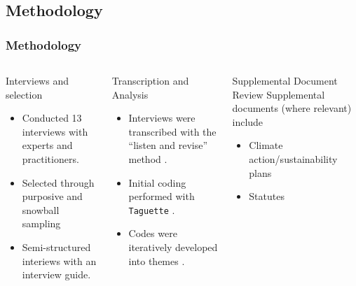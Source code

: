 \subsection{Methodology}

\begin{frame}
    \frametitle{Methodology}


    \begin{columns}
        \column[t]{3.33cm}
        \begin{block}{Interviews and selection}
            \begin{itemize}[<+->]
                \item Conducted 13 interviews with experts and practitioners.
                \item Selected through purposive and snowball sampling
                \item Semi-structured interiews with an interview guide.
            \end{itemize}
        \end{block}
        \pause
        \column[t]{3.33cm}
        \begin{block}{Transcription and Analysis}
            \begin{itemize}[<+->]
                \item Interviews were transcribed with the ``listen and revise''
                method \cite{battaglia_listen_2024}.
                \item Initial coding performed with \texttt{Taguette}
                \cite{rampin_taguette_2021}.
                \item Codes were iteratively developed into themes
                \cite{braun_using_2006}.
            \end{itemize}
        \end{block}
        \pause
        \column[t]{3.33cm}
        \begin{block}{Supplemental Document Review}
            Supplemental documents (where relevant) include
            \begin{itemize}[<+->]
                \item Climate action/sustainability plans
                \item Statutes
            \end{itemize}
        \end{block}
    \end{columns}
\end{frame}

